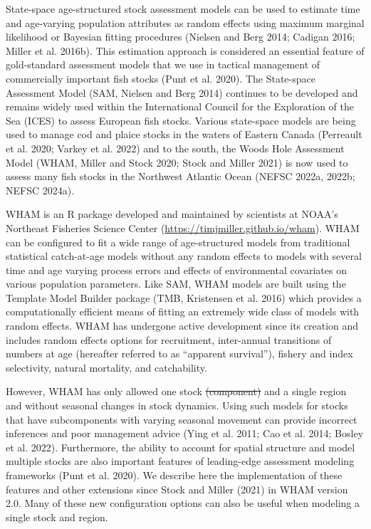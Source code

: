 \documentclass[
]{article}
\makeatletter
\providecommand{\DIFdeltex}[1]{{\protect\color{red}\sout{#1}}} %
\providecommand{\DIFdelbegin}{} %
\providecommand{\DIFdelend}{} %
\providecommand{\DIFdel}[1]{\texorpdfstring{\DIFdeltex{#1}}{}} %
\newcommand{\DIFscaledelfig}{0.5}
\newlength{\DIFdelgraphicswidth} %
\newlength{\DIFdelgraphicsheight} %
\newcommand{\DIFdelincludegraphics}[2][]{%
\sbox{\DIFdelgraphicsbox}{\DIFOincludegraphics[#1]{#2}}%
\settoboxwidth{\DIFdelgraphicswidth}{\DIFdelgraphicsbox} %
\settoboxtotalheight{\DIFdelgraphicsheight}{\DIFdelgraphicsbox} %
\scalebox{\DIFscaledelfig}{%
\parbox[b]{\DIFdelgraphicswidth}{\usebox{\DIFdelgraphicsbox}\\[-\baselineskip] \rule{\DIFdelgraphicswidth}{0em}}\llap{\resizebox{\DIFdelgraphicswidth}{\DIFdelgraphicsheight}{%
\setlength{\unitlength}{\DIFdelgraphicswidth}%
\begin{picture}(1,1)%
\thicklines\linethickness{2pt} %
{\color[rgb]{1,0,0}\put(0,0){\framebox(1,1){}}}%
{\color[rgb]{1,0,0}\put(0,0){\line( 1,1){1}}}%
{\color[rgb]{1,0,0}\put(0,1){\line(1,-1){1}}}%
\end{picture}%
}\hspace*{3pt}}} %
} %
\DeclareRobustCommand{\DIFdelbegin}{\DIFOdelbegin \let\includegraphics\DIFdelincludegraphics} %
\DeclareRobustCommand{\DIFdelend}{\DIFOaddend \let\includegraphics\DIFOincludegraphics} %
\let\sout@orig\sout %
\renewcommand{\sout}[1]{\ifmmode\text{\sout@orig{\ensuremath{#1}}}\else\sout@orig{#1}\fi} %
\makeatother
\begin{document}
State-space age-structured stock assessment models can be used to estimate time and age-varying population attributes as random effects using maximum marginal likelihood or Bayesian fitting procedures (Nielsen and Berg 2014; Cadigan 2016; Miller et al. 2016b). This estimation approach is considered an essential feature of gold-standard assessment models that we use in tactical management of commercially important fish stocks (Punt et al. 2020). The State-space Assessment Model (SAM, Nielsen and Berg 2014) continues to be developed and remains widely used within the International Council for the Exploration of the Sea (ICES) to assess European fish stocks. Various state-space models are being used to manage cod and plaice stocks in the waters of Eastern Canada (Perreault et al. 2020; Varkey et al. 2022) and to the south, the Woods Hole Assessment Model (WHAM, Miller and Stock 2020; Stock and Miller 2021) is now used to assess many fish stocks in the Northwest Atlantic Ocean (NEFSC 2022a, 2022b; NEFSC 2024a).

WHAM is an R package developed and maintained by scientists at NOAA's Northeast Fisheries Science Center (\url{https://timjmiller.github.io/wham}). WHAM can be configured to fit a wide range of age-structured models from traditional statistical catch-at-age models without any random effects to models with several time and age varying process errors and effects of environmental covariates on various population parameters. Like SAM, WHAM models are built using the Template Model Builder package (TMB, Kristensen et al. 2016) which provides a computationally efficient means of fitting an extremely wide class of models with random effects. WHAM has undergone active development since its creation and includes random effects options for recruitment, inter-annual transitions of numbers at age (hereafter referred to as ``apparent survival''), fishery and index selectivity, natural mortality, and catchability.

However, WHAM has only allowed one stock \DIFdelbegin \DIFdel{(component) }\DIFdelend and a single region and without seasonal changes in stock dynamics. Using such models for stocks that have subcomponents with varying seasonal movement can provide incorrect inferences and poor management advice (Ying et al. 2011; Cao et al. 2014; Bosley et al. 2022). Furthermore, the ability to account for spatial structure and model multiple stocks are also important features of leading-edge assessment modeling frameworks (Punt et al. 2020). We describe here the implementation of these features and other extensions since Stock and Miller (2021) in WHAM version 2.0. Many of these new configuration options can also be useful when modeling a single stock and region.
\end{document}
